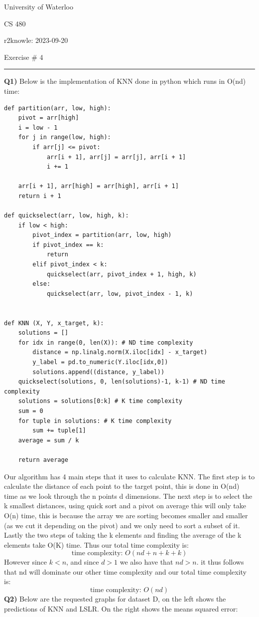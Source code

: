 \documentclass{article}
\begin{document}
\begin{titlepage}
	\setlength{\parindent}{0pt}
	\large

\vspace*{-2cm}


University of Waterloo \par
CS 480 \par
\vspace{0.05cm}
r2knowle: 2023-09-20
\vspace{0.2cm}

{\huge Exercise \# 4 \par}
\hrule

\vspace{0.5cm}
\textbf{Q1)} Below is the implementation of KNN done in python which runs in O(nd) time:
\begin{lstlisting}
def partition(arr, low, high): 
    pivot = arr[high]
    i = low - 1
    for j in range(low, high):
        if arr[j] <= pivot:
            arr[i + 1], arr[j] = arr[j], arr[i + 1]
            i += 1

    arr[i + 1], arr[high] = arr[high], arr[i + 1]
    return i + 1

def quickselect(arr, low, high, k):
    if low < high:
        pivot_index = partition(arr, low, high)
        if pivot_index == k:
            return
        elif pivot_index < k:
            quickselect(arr, pivot_index + 1, high, k) 
        else:
            quickselect(arr, low, pivot_index - 1, k)


def KNN (X, Y, x_target, k):
    solutions = []
    for idx in range(0, len(X)): # ND time complexity
        distance = np.linalg.norm(X.iloc[idx] - x_target)
        y_label = pd.to_numeric(Y.iloc[idx,0])
        solutions.append((distance, y_label))
    quickselect(solutions, 0, len(solutions)-1, k-1) # ND time complexity
    solutions = solutions[0:k] # K time complexity
    sum = 0
    for tuple in solutions: # K time complexity
        sum += tuple[1]
    average = sum / k

    return average
\end{lstlisting}
Our algorithm has 4 main steps that it uses to calculate KNN. The first step is to calculate the distance of each point to the target point, this is done in O(nd) time as we look through the n points d dimensions. The next step is to select the k smallest distances, using quick sort and a pivot on average this will only take O(n) time, this is because the array we are sorting becomes smaller and smaller (as we cut it depending on the pivot) and we only need to sort a subset of it. Lastly the two steps of taking the k elements and finding the average of the k elements take O(K) time. Thus our total time complexity is:
\[ \text{time complexity: } O(nd + n + k + k) \]
However since $k<n$, and since $d>1$ we also have that $nd > n$. it thus follows that nd will dominate our other time complexity and our total time complexity is:
\[ \text{time complexity: } O(nd) \]
\newpage
\textbf{Q2)} Below are the requested graphs for dataset D, on the left shows the predictions of KNN and LSLR. On the right shows the means squared error: \\


\end{titlepage}
\end{document}
